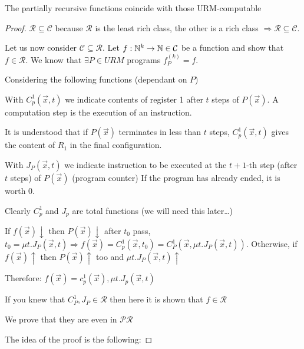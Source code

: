 \begin{theorem}[$\mathcal{R} = \mathcal{C}$]\label{reqc} The partially recursive
  functions coincide with those URM-computable
  
  \begin{proof}
    $ \mathcal{R} \subseteq \mathcal{C} $ because $\mathcal{R}$ is the
    least rich class, the other is a rich class
    $\Rightarrow \mathcal{R}\subseteq\mathcal{C}$.

    Let us now consider $ \mathcal{C} \subseteq \mathcal{R} $. Let
    $ f:\mathbb{N}^k\rightarrow\mathbb{N} \in \mathcal{C} $ be a function and show
    that $ f \in \mathcal{R} $. We know that $ \exists P \in URM $
    programs $ f_P^{(k)} = f$.

    Considering the following functions (dependant on $P$)

    With $ C_p^1(\vec{x}, t) $ we indicate contents of register 1 after $t$ steps of $ P(\vec{x}) $. A computation step is the execution of an instruction.

    It is understood that if $P(\vec{x})$ terminates in less than $t$ steps, $ C_p^1(\vec{x}, t) $ gives the content of $R_1$ in the final configuration.

    With $ J_P(\vec{x},t) $ we indicate instruction to be executed at the $t+1$-th step (after $t$ steps) of $P(\vec{x})$ (program counter) If the program has already ended, it is worth 0.

    Clearly $C_p^1$ and $J_p$ are total functions (we will need this later\dots)

    If $ f(\vec{x})\downarrow $ then $ P(\vec{x})\downarrow $ after $ t_0 $ pass, $ t_0 = \mu t. J_P(\vec{x},t) \Rightarrow f(\vec{x}) = C_p^1(\vec{x},t_0) = C_P^1(\vec{x}, \mu t.J_P(\vec{x},t)) $.
    Otherwise, if $ f(\vec{x})\uparrow $ then $P(\vec{x})\uparrow$ too and $ \mu t.J_P(\vec{x},t)\uparrow $

    Therefore:
    $f(\vec{x}) = c_p^1(\vec{x}),\mu t.J_p(\vec{x},t)$


    If you knew that $ C_P^1, J_P \in \mathcal{R} $ then here it is shown that $ f \in \mathcal{R} $

    We prove that they are even in $ \mathcal{PR} $

    The idea of the proof is the following:


\end{proof}
\end{theorem}
